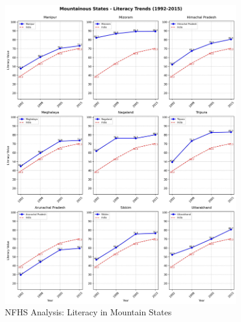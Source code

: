 \begin{figure}[H]
    \centering
    \includegraphics[width=0.9\textwidth]{figures/nfhs/mountainous_states_literacy_subplots.pdf}
    \caption{NFHS Analysis:  Literacy  in Mountain States}
    \label{fig:nfhs_mountain_literacy}
\end{figure}

